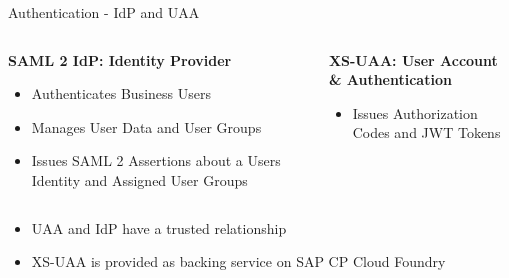 \begin{frame}{Authentication - IdP and UAA}

\begin{columns}
    \begin{column}[T]{.47\textwidth}
    \textbf{SAML 2 IdP: Identity Provider}
    \begin{itemize}
        \item Authenticates Business Users
        \item Manages User Data and User Groups
        \item Issues SAML 2 Assertions about a Users Identity and Assigned User Groups
    \end{itemize}
    \end{column}
    \begin{column}[T]{.53\textwidth}
    \textbf{XS-UAA: User Account \& Authentication}
    \begin{itemize}
        \item Issues  Authorization Codes and JWT Tokens
    \end{itemize}
    \end{column}
\end{columns}
\vfill
\begin{itemize}
\item UAA and IdP have a trusted relationship
\item XS-UAA is provided as backing service on SAP CP Cloud Foundry
\end{itemize}
\end{frame}


